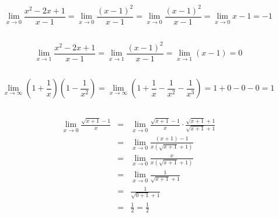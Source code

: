 \documentclass{article}
\begin{document}
	
	\section{}
		\subsection{}
		\[
	\lim_{x \to 0} \frac{x^2 - 2x + 1}{x - 1}
	= \lim_{x \to 0}\frac{(x - 1)^2}{x - 1}=
	\lim_{x \to 0}\frac{(x - 1)^2}{x - 1} =\lim_{x \to 0} x - 1=\boxed{-1}
	\]
		\subsection{}
		
			\[	
\lim_{x \to 1} \frac{x^2 - 2x + 1}{x - 1}
= \lim_{x \to 1} \frac{(x - 1)^2}{x - 1}
= \lim_{x \to 1} (x - 1)
= \boxed{0}
\]	
		
		\subsection{}

	\[
\lim_{x \to \infty} \left(1 + \frac{1}{x}\right)\left(1 - \frac{1}{x^2}\right) =
\lim_{x \to \infty} \left(1 + \frac{1}{x} - \frac{1}{x^2} - \frac{1}{x^3}\right) =
1 + 0 - 0 - 0 = \boxed{1}
\]
	
	
			\subsection{}
	
\[
\begin{array}{rcl}
	\lim_{x \to 0} \frac{\sqrt{x+1}-1}{x} 
	& = & \lim_{x \to 0} \frac{\sqrt{x+1}-1}{x} \cdot \frac{\sqrt{x+1}+1}{\sqrt{x+1}+1} \\
	& = & \lim_{x \to 0} \frac{(x+1) - 1}{x(\sqrt{x+1}+1)} \\
	& = & \lim_{x \to 0} \frac{x}{x(\sqrt{x+1}+1)} \\
	& = & \lim_{x \to 0} \frac{1}{\sqrt{x+1}+1} \\
	& = & \frac{1}{\sqrt{0+1}+1} \\
	& = & \frac{1}{2} = \boxed{\frac{1}{2}}
\end{array}
\]


			\subsection{}
\end{document}
